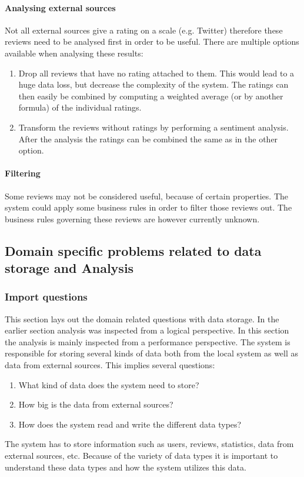 \documentclass{article}
\begin{document}
\paragraph{Analysing external sources}
Not all external sources give a rating on a scale (e.g. Twitter) therefore these reviews need to be analysed first in order to be useful. There are multiple options available when analysing these results:
\begin{enumerate}
\item Drop all reviews that have no rating attached to them. This would lead to a huge data loss, but decrease the complexity of the system. The ratings can then easily be combined by computing a weighted average (or by another formula) of the individual ratings.
\item Transform the reviews without ratings by performing a sentiment analysis. After the analysis the ratings can be combined the same as in the other option.
\end{enumerate}

\paragraph{Filtering}
Some reviews may not be considered useful, because of certain properties. The system could apply some business rules in order to filter those reviews out. The business rules governing these reviews are however currently unknown. 




\subsection{Domain specific problems related to data storage and Analysis}
\subsubsection{Import questions}
This section lays out the domain related questions with data storage. In the earlier section analysis was inspected from a logical perspective. In this section the analysis is mainly inspected from a performance perspective. 
The system is responsible for storing several kinds of data both from the local system as well as data from external sources. This implies several questions:
\begin{enumerate}
\item What kind of data does the system need to store?
\item How big is the data from external sources?
\item How does the system read and write the different data types?
\end{enumerate}
The system has to store information such as users, reviews, statistics, data from external sources, etc. Because of the variety of data types it is important to understand these data types and how the system utilizes this data.
\end{document}
